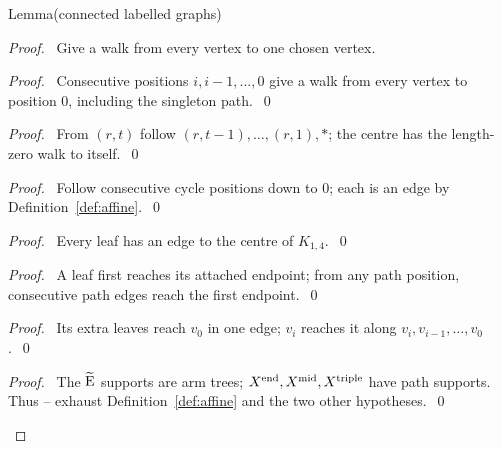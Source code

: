 \begin{namedresult}{Lemma}{(connected labelled graphs)}\label{lem:rem-labelled-connected}
\end{namedresult}
\begin{proof}
\pfsketch\ Give a walk from every vertex to one chosen vertex.
\begin{proof}\pf\ Consecutive positions $i,i-1,\ldots,0$ give a walk
from every vertex to position 0, including the singleton path.~\qed\end{proof}
\begin{proof}\pf\ From $(r,t)$ follow $(r,t-1),\ldots,(r,1),*$;
the centre has the length-zero walk to itself.~\qed\end{proof}
\begin{proof}\pf\ Follow consecutive cycle positions down to 0;
each is an edge by Definition~\ref{def:affine}.~\qed\end{proof}
\begin{proof}\pf\ Every leaf has an edge to the centre of $K_{1,4}$.~\qed\end{proof}
\begin{proof}\pf\ A leaf first reaches its attached endpoint; from
any path position, consecutive path edges reach the first endpoint.~\qed\end{proof}
\begin{proof}\pf\ Its extra leaves reach $v_0$ in one edge; $v_i$
reaches it along $v_i,v_{i-1},\ldots,v_0$.~\qed\end{proof}
\qedstep
\begin{proof}\pf\ The $\widetilde{\mathrm{E}}$ supports are arm trees;
$X^{\rm end},X^{\rm mid},X^{\rm triple}$ have path supports.
Thus -- exhaust
Definition~\ref{def:affine} and the two other hypotheses.~\qed\end{proof}
\end{proof}

